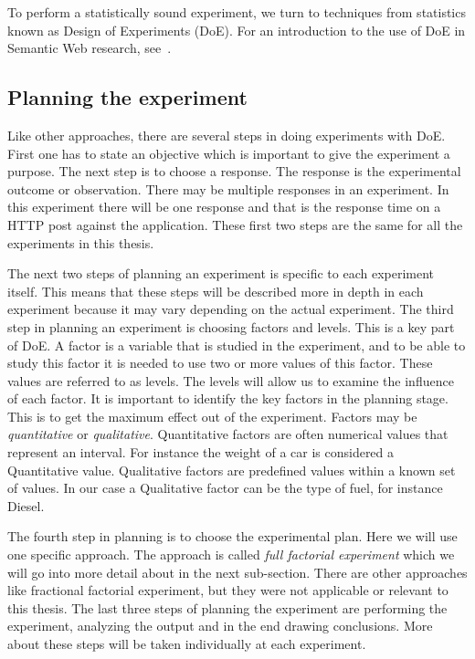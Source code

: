\documentclass{llncs}
\begin{document}
To perform a statistically sound experiment, we turn to techniques
from statistics known as Design of Experiments (DoE). For an
introduction to the use of DoE in Semantic Web research, see~\cite{Kjern}.

\subsection{Planning the experiment}
Like other approaches, there are several steps in doing experiments with
DoE.  First one has to state an objective which is important to give
the experiment a purpose.  The next step is to choose a response. The
response is the experimental outcome or observation. There may be
multiple responses in an experiment. In this experiment there will be
one response and that is the response time on a HTTP post against the
application.  These first two steps are the same for all the
experiments in this thesis.

The next two steps of planning an experiment is specific to each
experiment itself. This means that these steps will be described more
in depth in each experiment because it may vary depending on the
actual experiment.  The third step in planning an experiment is
choosing factors and levels. This is a key part of DoE. A factor is a
variable that is studied in the experiment, and to be able to study
this factor it is needed to use two or more values of this
factor. These values are referred to as levels.  The levels will allow
us to examine the influence of each factor. It is important to
identify the key factors in the planning stage. This is to get the
maximum effect out of the experiment.  Factors may be
\emph{quantitative} or \emph{qualitative}. Quantitative factors
are often numerical values that represent an interval. For instance
the weight of a car is considered a Quantitative value. Qualitative
factors are predefined values within a known set of values.  In our
case a Qualitative factor can be the type of fuel, for instance
Diesel.

The fourth step in planning is to choose the experimental plan. Here
we will use one specific approach. The approach is called \emph{full
  factorial experiment} which we will go into more detail about in the
next sub-section. There are other approaches like fractional factorial
experiment, but they were not applicable or relevant to this thesis.
The last three steps of planning the experiment are performing the
experiment, analyzing the output and in the end drawing
conclusions. More about these steps will be taken individually at each
experiment.~\cite{PlanExp}
\end{document}

